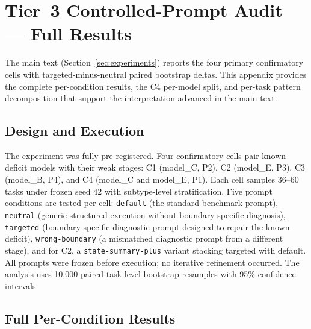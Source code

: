 \clearpage
\section{Tier~3 Controlled-Prompt Audit --- Full Results}
\label{sec:tier3_full}

The main text (Section~\ref{sec:experiments}) reports the four primary confirmatory cells with targeted-minus-neutral paired bootstrap deltas. This appendix provides the complete per-condition results, the C4 per-model split, and per-task pattern decomposition that support the interpretation advanced in the main text.

\subsection{Design and Execution}

The experiment was fully pre-registered. Four confirmatory cells pair known deficit models with their weak stages: C1 (model_C, P2), C2 (model_E, P3), C3 (model_B, P4), and C4 (model_C and model_E, P1). Each cell samples 36--60 tasks under frozen seed 42 with subtype-level stratification. Five prompt conditions are tested per cell: \texttt{default} (the standard benchmark prompt), \texttt{neutral} (generic structured execution without boundary-specific diagnosis), \texttt{targeted} (boundary-specific diagnostic prompt designed to repair the known deficit), \texttt{wrong-boundary} (a mismatched diagnostic prompt from a different stage), and for C2, a \texttt{state-summary-plus} variant stacking targeted with default. All prompts were frozen before execution; no iterative refinement occurred. The analysis uses 10,000 paired task-level bootstrap resamples with 95\% confidence intervals.

\subsection{Full Per-Condition Results}

